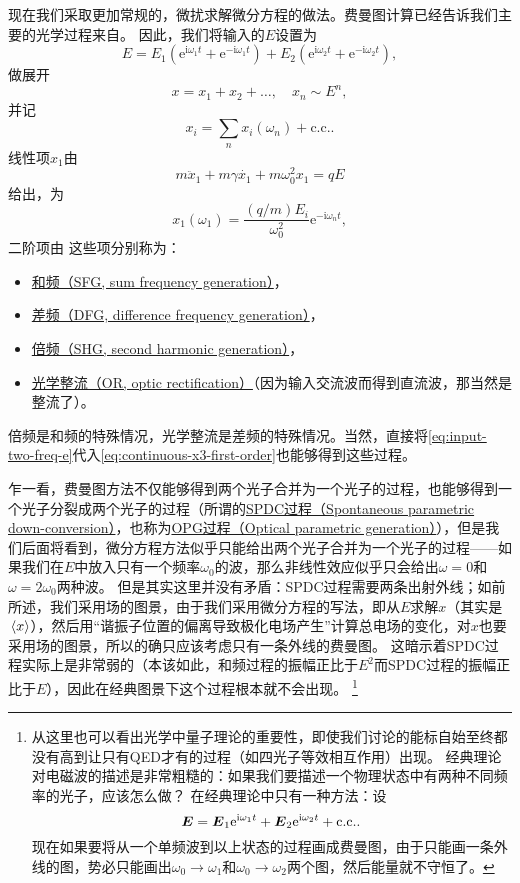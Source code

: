 \documentclass[UTF8, a4paper]{ctexart}
\newcommand*{\ee}{\mathrm{e}}
\newcommand*{\ii}{\mathrm{i}}
\renewcommand{\autoref}{\prettyref}
\newcommand{\concept}[1]{\underline{#1}}
\begin{document}
现在我们采取更加常规的，微扰求解微分方程的做法。费曼图计算已经告诉我们主要的光学过程来自\autoref{fig:first-order-x3-external}。
因此，我们将输入的$E$设置为
\begin{equation}
    E = E_1 (\ee^{\ii \omega_1 t} + \ee^{-\ii \omega_1 t}) + E_2 (\ee^{\ii \omega_2 t} + \ee^{-\ii \omega_2 t}), 
    \label{eq:input-two-freq-e}
\end{equation}
做展开
\begin{equation}
    x = x_1 + x_2 + \ldots, \quad x_n \sim E^{n },
\end{equation}
并记
\begin{equation}
    x_i = \sum_n x_i(\omega_n) + \text{c.c.}.
\end{equation}
线性项$x_1$由
\[
    m \ddot{x}_1 + m \gamma \dot{x_1} +  m \omega_0^2 x_1 = q E
\]
给出，为
\begin{equation}
    x_1(\omega_1) = \frac{(q/m) E_i}{\omega_0^2 } \ee^{-\ii \omega_n t},
\end{equation}
二阶项由
这些项分别称为：
\begin{itemize}
    \item \concept{和频（SFG, sum frequency generation）}，
    \item \concept{差频（DFG, difference frequency generation）}，
    \item \concept{倍频（SHG, second harmonic generation）}，
    \item \concept{光学整流（OR, optic rectification）}（因为输入交流波而得到直流波，那当然是整流了）。
\end{itemize}
倍频是和频的特殊情况，光学整流是差频的特殊情况。当然，直接将\eqref{eq:input-two-freq-e}代入\eqref{eq:continuous-x3-first-order}也能够得到这些过程。

乍一看，费曼图方法不仅能够得到两个光子合并为一个光子的过程，也能够得到一个光子分裂成两个光子的过程（所谓的\concept{SPDC过程（Spontaneous parametric down-conversion）}，也称为\concept{OPG过程（Optical parametric generation）}），但是我们后面将看到，微分方程方法似乎只能给出两个光子合并为一个光子的过程——如果我们在$E$中放入只有一个频率$\omega_0$的波，那么非线性效应似乎只会给出$\omega=0$和$\omega=2\omega_0$两种波。
但是其实这里并没有矛盾：SPDC过程需要两条出射外线；如前所述，我们采用场的图景，由于我们采用微分方程的写法，即从$E$求解$x$（其实是$\expval*{x}$），然后用“谐振子位置的偏离导致极化电场产生”计算总电场的变化，对$x$也要采用场的图景，所以的确只应该考虑只有一条外线的费曼图。
这暗示着SPDC过程实际上是非常弱的（本该如此，和频过程的振幅正比于$E^2$而SPDC过程的振幅正比于$E$），因此在经典图景下这个过程根本就不会出现。%
\footnote{
    从这里也可以看出光学中量子理论的重要性，即使我们讨论的能标自始至终都没有高到让只有QED才有的过程（如四光子等效相互作用）出现。
    经典理论对电磁波的描述是非常粗糙的：如果我们要描述一个物理状态中有两种不同频率的光子，应该怎么做？
    在经典理论中只有一种方法：设
    \[
        \vb*{E} = \vb*{E}_1 \ee^{\ii \omega_1 t} + \vb*{E}_2 \ee^{\ii \omega_2 t} + \text{c.c.}.
    \]
    现在如果要将从一个单频波到以上状态的过程画成费曼图，由于只能画一条外线的图，势必只能画出$\omega_0 \to \omega_1$和$\omega_0 \to \omega_2$两个图，然后能量就不守恒了。
}%
\end{document}
